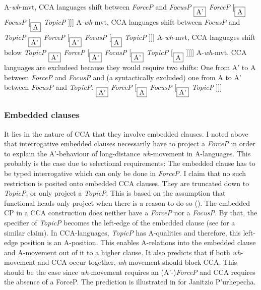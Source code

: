\documentclass[output=paper,colorlinks,citecolor=brown]{langscibook}
\begin{document}
\ea\label{lohningerderivation1}
\ea \cmark A-\textit{wh}-mvt, \cmark CCA languages shift between \emph{ForceP} and \emph{FocusP}
\ex {[}$_{\fbox{A'}}$ \emph{ForceP} \rightarrow [$_{\fbox{A}}$  \emph{FocusP} [$_{\fbox{A}}$  \emph{TopicP} {]]]}
\z\z 
\ea
\ea \xmark A-\textit{wh}-mvt, \cmark CCA languages shift between \emph{FocusP} and \emph{TopicP}
\ex {[}$_{\fbox{A'}}$ \emph{ForceP}  [$_{\fbox{A'}}$  \emph{FocusP} \rightarrow [$_{\fbox{A}}$  \emph{TopicP} {]]]}
\z\z 
\ea
\ea \xmark A-\textit{wh}-mvt, \xmark CCA languages shift below \emph{TopicP}
\ex {[}$_{\fbox{A'}}$ \emph{ForceP} [$_{\fbox{A'}}$  \emph{FocusP} [$_{\fbox{A'}}$  \emph{TopicP}  \rightarrow [$_{\fbox{A}}$ {]]]]}
\z\z 
\ea
\ea \cmark A-\textit{wh}-mvt, \xmark CCA languages are excludeed because they would require two shifts: One from A' to A between \emph{ForceP} and \emph{FocusP} and (a syntactically excluded) one from A to A' between \emph{FocusP} and \emph{TopicP}.
\ex * {[}$_{\fbox{A'}}$ \emph{ForceP} \rightarrow [$_{\fbox{A}}$  \emph{FocusP} \rightarrow [$_{\fbox{A'}}$  \emph{TopicP} {]]]}
\z\z 

\subsubsection{Embedded clauses} It lies in the nature of CCA that they involve embedded clauses. I noted above that interrogative embedded clauses necessarily have to project a \emph{ForceP} in order to explain the A'-behaviour of long-distance \textit{wh}-movement in A-languages. This probably is the case due to selectional requirements: The embedded clause has to be typed interrogative which can only be done in \emph{ForceP}. I claim that no such restriction is posited onto embedded CCA clauses. They are truncated down to \emph{TopicP}, or only project a \emph{TopicP}. This is based on the assumption that functional heads only project when there is a reason to do so (\citealp{bovskovic1997syntax}). The embedded CP in a CCA construction does neither have a \emph{ForceP} nor a \emph{FocusP}. By that, the specifier of \emph{TopicP} becomes the left-edge of the embedded clause (see \citealp{csener2008non} for a similar claim). In CCA-languages, \emph{TopicP} has A-qualities and therefore, this left-edge position is an A-position. This enables A-relations into the embedded clause and A-movement out of it to a higher clause. It also predicts that if both \textit{wh}-movement and CCA occur together, \textit{wh}-movement should block CCA. This should be the case since \textit{wh}-movement requires an (A'-)\emph{ForceP} and CCA requires the absence of a ForceP. The prediction is illustrated in \citet{zyman2018rich} for Janitzio P’urhepecha. 
\end{document}
